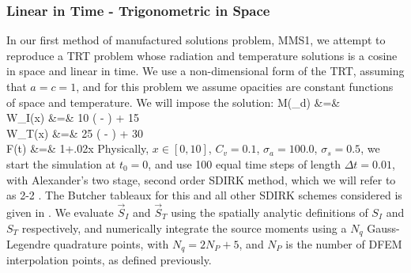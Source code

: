 \subsubsection{Linear in Time - Trigonometric in Space  }
In our first method of manufactured solutions problem, MMS1, we attempt to reproduce a TRT problem whose radiation and temperature solutions is a cosine in space and  linear in time.
We use a non-dimensional form of the TRT, assuming that $a=c=1$, and for this problem we assume opacities are constant functions of space and temperature.
We will impose the solution:
\beanum
M(\mu_d) &=&  \\
W_I(x) &=& 10 \cos\left(  -  \right) + 15\\
W_T(x) &=&  25 \cos\left(  -  \right) + 30\\
F(t) &=& 1+.02x \pep
\eeanum
Physically, $x\in[0,10]$, $C_v = 0.1$, $\sigma_a = 100.0$, $\sigma_s = 0.5$, we start the simulation at $t_0 = 0$, and use 100 equal time steps of length $\Delta t = 0.01$, with Alexander's two stage, second order SDIRK method, which we will refer to as 2-2 \cite{alexander}.  The Butcher tableaux for this and all other SDIRK schemes considered is given in .
We evaluate $\vec{S}_I$ and $\vec{S}_T$ using the spatially analytic definitions of $S_I$ and $S_T$ respectively, and numerically integrate the source moments using a $N_q$ Gauss-Legendre quadrature points, with $N_q = 2N_P + 5$, and $N_P$ is the number of DFEM interpolation points, as defined previously.

